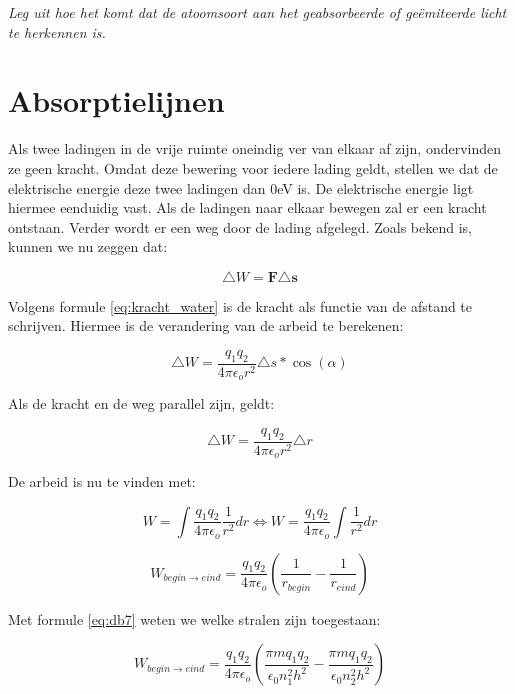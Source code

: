 \emph{Leg uit hoe het komt dat de atoomsoort aan het geabsorbeerde
of geëmiteerde licht te herkennen is.}


\section{Absorptielijnen}

Als twee ladingen in de vrije ruimte oneindig ver van elkaar af zijn,
ondervinden ze geen kracht. Omdat deze bewering voor iedere lading
geldt, stellen we dat de elektrische energie deze twee ladingen dan
0eV is. De elektrische energie ligt hiermee eenduidig vast. Als de
ladingen naar elkaar bewegen zal er een kracht ontstaan. Verder wordt
er een weg door de lading afgelegd. Zoals bekend is, kunnen we nu
zeggen dat:

\begin{equation}
\triangle W=\mathbf{F}\triangle\boldsymbol{\mathbf{s}}
\end{equation}


Volgens formule \ref{eq:kracht_water} is de kracht als functie van de
afstand te schrijven. Hiermee is de verandering van de arbeid te
berekenen:

\begin{equation}
\triangle W=\frac{q_{1}q_{2}}{4\pi\epsilon_{o}r^{2}}\triangle s*\cos(\alpha)
\end{equation}


Als de kracht en de weg parallel zijn, geldt:

\begin{equation}
\triangle W=\frac{q_{1}q_{2}}{4\pi\epsilon_{o}r^{2}}\triangle r
\end{equation}


De arbeid is nu te vinden met:

\begin{equation}
W=\int\frac{q_{1}q_{2}}{4\pi\epsilon_{o}}\frac{1}{r^{2}}dr
\Leftrightarrow W=\frac{q_{1}q_{2}}{4\pi\epsilon_{o}}\int\frac{1}{r^{2}}dr
\end{equation}


\begin{equation}
W_{begin\rightarrow eind}
=\frac{q_{1}q_{2}}{4\pi\epsilon_{o}}(\frac{1}{r_{begin}}-\frac{1}{r_{eind}})
\end{equation}


Met formule \ref{eq:db7} weten we welke stralen zijn toegestaan:

\begin{equation}
W_{begin\rightarrow eind}
=\frac{q_{1}q_{2}}{4\pi\epsilon_{o}}(\frac{\pi mq_{1}q_{2}}{\epsilon_{0}n_{1}^{2}h^{2}}-\frac{\pi mq_{1}q_{2}}{\epsilon_{0}n_{2}^{2}h^{2}})
\end{equation}


